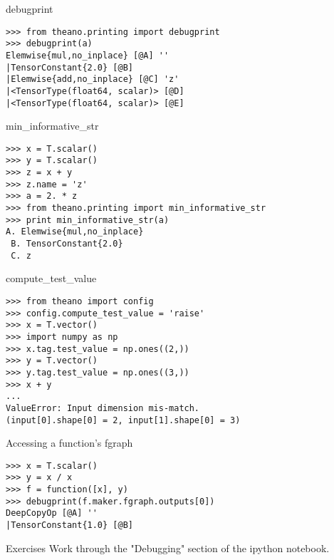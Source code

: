 \documentclass[utf8x,hyperref={pdfpagelabels=false}]{beamer}
\begin{document}
\begin{frame}[fragile]{debugprint}
\begin{lstlisting}
>>> from theano.printing import debugprint
>>> debugprint(a)
Elemwise{mul,no_inplace} [@A] ''
|TensorConstant{2.0} [@B]
|Elemwise{add,no_inplace} [@C] 'z'
|<TensorType(float64, scalar)> [@D]
|<TensorType(float64, scalar)> [@E]
\end{lstlisting}
\end{frame}

\begin{frame}[fragile]{min\_informative\_str}
\begin{lstlisting}
>>> x = T.scalar()
>>> y = T.scalar()
>>> z = x + y
>>> z.name = 'z'
>>> a = 2. * z
>>> from theano.printing import min_informative_str
>>> print min_informative_str(a)
A. Elemwise{mul,no_inplace}
 B. TensorConstant{2.0}
 C. z
\end{lstlisting}
\end{frame}

\begin{frame}[fragile]{compute\_test\_value}
\begin{lstlisting}
>>> from theano import config
>>> config.compute_test_value = 'raise'
>>> x = T.vector()
>>> import numpy as np
>>> x.tag.test_value = np.ones((2,))
>>> y = T.vector()
>>> y.tag.test_value = np.ones((3,))
>>> x + y
...
ValueError: Input dimension mis-match.
(input[0].shape[0] = 2, input[1].shape[0] = 3)
\end{lstlisting}
\end{frame}

\begin{frame}[fragile]{Accessing a function’s fgraph}
\begin{lstlisting}
>>> x = T.scalar()
>>> y = x / x
>>> f = function([x], y)
>>> debugprint(f.maker.fgraph.outputs[0])
DeepCopyOp [@A] ''
|TensorConstant{1.0} [@B]
\end{lstlisting}
\end{frame}

\begin{frame}{Exercises}
Work through the "Debugging" section of the ipython notebook.
\end{frame}
\end{document}
